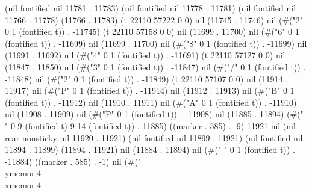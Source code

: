 (nil fontified nil 11781 . 11783) (nil fontified nil 11778 . 11781) (nil fontified nil 11766 . 11778) (11766 . 11783) (t 22110 57222 0 0) nil (11745 . 11746) nil (#("2" 0 1 (fontified t)) . -11745) (t 22110 57158 0 0) nil (11699 . 11700) nil (#("6" 0 1 (fontified t)) . -11699) nil (11699 . 11700) nil (#("8" 0 1 (fontified t)) . -11699) nil (11691 . 11692) nil (#("4" 0 1 (fontified t)) . -11691) (t 22110 57127 0 0) nil (11847 . 11850) nil (#("3" 0 1 (fontified t)) . -11847) nil (#("/" 0 1 (fontified t)) . -11848) nil (#("2" 0 1 (fontified t)) . -11849) (t 22110 57107 0 0) nil (11914 . 11917) nil (#("P" 0 1 (fontified t)) . -11914) nil (11912 . 11913) nil (#("B" 0 1 (fontified t)) . -11912) nil (11910 . 11911) nil (#("A" 0 1 (fontified t)) . -11910) nil (11908 . 11909) nil (#("P" 0 1 (fontified t)) . -11908) nil (11885 . 11894) (#("              " 0 9 (fontified t) 9 14 (fontified t)) . 11885) ((marker . 585) . -9) 11921 nil (nil rear-nonsticky nil 11920 . 11921) (nil fontified nil 11899 . 11921) (nil fontified nil 11894 . 11899) (11894 . 11921) nil (11884 . 11894) nil (#("
" 0 1 (fontified t)) . -11884) ((marker . 585) . -1) nil (#("         \\ymemori{4}
         \\xmemori{4}
